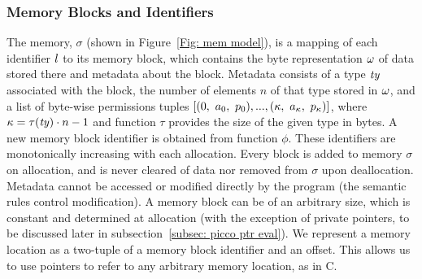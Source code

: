 \subsubsection{Memory Blocks and Identifiers} \label{subsec: mem block}
The memory, $\sigma$ (shown in Figure~\ref{Fig: mem model}), is a mapping of each identifier $l$ to its memory block, which contains 
the byte representation $\omega$ of data stored there and metadata about the block.
Metadata consists of  
a type $\mathit{ty}$ associated with the block, 
the number of elements $n$ of that type stored in $\omega$, 
and a list of byte-wise permissions tuples $[(0,\ \llabel_0,\ \perm_0), ..., (\bytelen,\ \llabel_\bytelen,\ \perm_\bytelen)]$, where $\kappa = \tau(\mathit{ty})\cdot n - 1$ and function $\tau$ provides the size of the given type in bytes. 
A new memory block identifier is obtained from function $\phi$. 
These identifiers are monotonically increasing with each allocation. 
Every block is added to memory $\sigma$ on allocation, and is never cleared of data nor removed from $\sigma$ upon deallocation. 
Metadata cannot be accessed or modified directly by the program (the semantic rules control modification).
A memory block can be of an arbitrary size, which is constant and determined at allocation (with the exception of private pointers, to be discussed later in subsection~\ref{subsec: picco ptr eval}). 
We represent a memory location as a two-tuple of a memory block identifier and an offset. This allows us to use pointers to refer to any arbitrary memory location, as in C.





